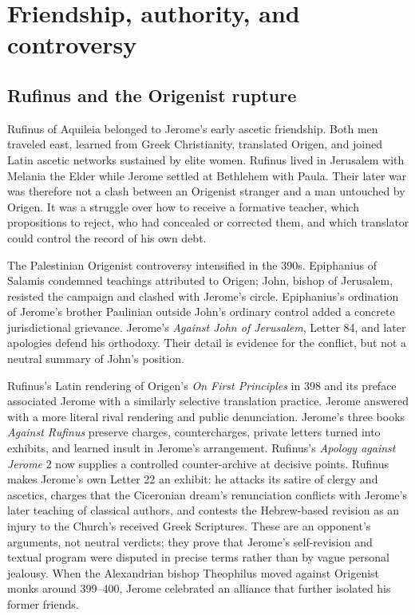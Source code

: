 \section{Friendship, authority, and controversy}\label{sec:jerome-controversies}

\subsection{Rufinus and the Origenist rupture}

Rufinus of Aquileia belonged to Jerome's early ascetic friendship. Both men
traveled east, learned from Greek Christianity, translated Origen, and joined
Latin ascetic networks sustained by elite women. Rufinus lived in Jerusalem
with Melania the Elder while Jerome settled at Bethlehem with Paula. Their
later war was therefore not a clash between an Origenist stranger and a man
untouched by Origen. It was a struggle over how to receive a formative teacher,
which propositions to reject, who had concealed or corrected them, and which
translator could control the record of his own debt.

The Palestinian Origenist controversy intensified in the 390s. Epiphanius of
Salamis condemned teachings attributed to Origen; John, bishop of Jerusalem,
resisted the campaign and clashed with Jerome's circle. Epiphanius's ordination
of Jerome's brother Paulinian outside John's ordinary control added a concrete
jurisdictional grievance. Jerome's \emph{Against John of Jerusalem}, Letter 84,
and later apologies defend his orthodoxy. Their detail is evidence for the
conflict, but not a neutral summary of John's position.

Rufinus's Latin rendering of Origen's \emph{On First Principles} in 398 and its
preface associated Jerome with a similarly selective translation practice.
Jerome answered with a more literal rival rendering and public denunciation.
Jerome's three books \emph{Against Rufinus} preserve charges,
countercharges, private letters turned into exhibits, and learned insult in
Jerome's arrangement. Rufinus's \emph{Apology against Jerome} 2 now supplies a
controlled counter-archive at decisive points. Rufinus makes Jerome's own
Letter 22 an exhibit: he attacks its satire of clergy and ascetics, charges
that the Ciceronian dream's renunciation conflicts with Jerome's later teaching
of classical authors, and contests the Hebrew-based revision as an injury to
the Church's received Greek Scriptures. These are an opponent's arguments, not
neutral verdicts; they prove that Jerome's self-revision and textual program
were disputed in precise terms rather than by vague personal jealousy. When
the Alexandrian bishop Theophilus moved against Origenist monks
around 399--400, Jerome celebrated an alliance that further isolated his
former friends.

